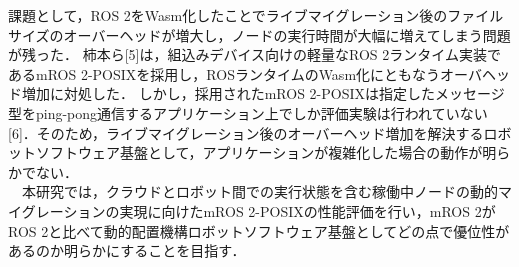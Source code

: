 \documentclass[11pt]{ujarticle}
\begin{document}
課題として，ROS 2をWasm化したことでライブマイグレーション後のファイルサイズのオーバーヘッドが増大し，ノードの実行時間が大幅に増えてしまう問題が残った．
柿本ら[5]は，組込みデバイス向けの軽量なROS 2ランタイム実装であるmROS 2-POSIXを採用し，ROSランタイムのWasm化にともなうオーバヘッド増加に対処した．
しかし，採用されたmROS 2-POSIXは指定したメッセージ型をping-pong通信するアプリケーション上でしか評価実験は行われていない[6]．そのため，ライブマイグレーション後のオーバーヘッド増加を解決するロボットソフトウェア基盤として，アプリケーションが複雑化した場合の動作が明らかでない．
\\　本研究では，クラウドとロボット間での実行状態を含む稼働中ノードの動的マイグレーションの実現に向けたmROS 2-POSIXの性能評価を行い，mROS 2がROS 2と比べて動的配置機構ロボットソフトウェア基盤としてどの点で優位性があるのか明らかにすることを目指す．
\end{document}
